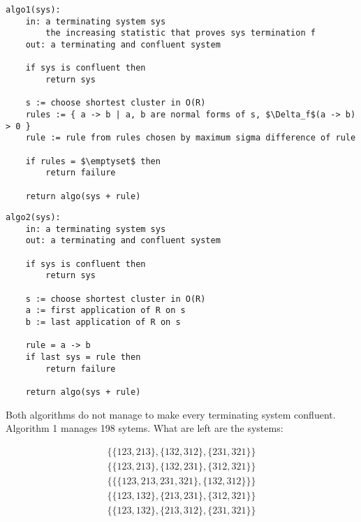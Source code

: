 \documentclass[openany, a4paper, 11pt, english]{article}
\theoremstyle{definition}
\begin{document}
\lstset{basicstyle=\footnotesize\ttfamily, frame=single, breaklines=true,
mathescape=true}

\begin{minipage}{\linewidth}
\begin{lstlisting}[title={Algorithm 1}]
algo1(sys):
    in: a terminating system sys
        the increasing statistic that proves sys termination f
    out: a terminating and confluent system

    if sys is confluent then
        return sys

    s := choose shortest cluster in O(R)
    rules := { a -> b | a, b are normal forms of s, $\Delta_f$(a -> b) > 0 }
    rule := rule from rules chosen by maximum sigma difference of rule

    if rules = $\emptyset$ then
        return failure

    return algo(sys + rule)
\end{lstlisting}
\end{minipage}

\begin{minipage}{\linewidth}
\begin{lstlisting}[title={Algorithm 2}]
algo2(sys):
    in: a terminating system sys
    out: a terminating and confluent system

    if sys is confluent then
        return sys

    s := choose shortest cluster in O(R)
    a := first application of R on s
    b := last application of R on s

    rule = a -> b
    if last sys = rule then
        return failure

    return algo(sys + rule)
\end{lstlisting}
\end{minipage}

Both algorithms do not manage to make every terminating system confluent.
Algorithm 1 manages 198 sytems. What are left are the systems:

\begin{gather*}
    \{\{123,213\},\{132,312\},\{231,321\}\} \\
    \{\{123,213\},\{132,231\},\{312,321\}\} \\
    \{\{\{123,213,231,321\},\{132,312\}\}\} \\
    \{\{123,132\},\{213,231\},\{312,321\}\} \\
    \{\{123,132\},\{213,312\},\{231,321\}\} 
\end{gather*}
\end{document}
